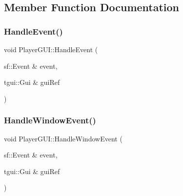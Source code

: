 \subsection{Member Function Documentation}
\mbox{\label{class_player_g_u_i_a06602d2c26b2e1a3edad345d483c6132}} 
\subsubsection{\texorpdfstring{Handle\+Event()}{HandleEvent()}}
{\footnotesize\ttfamily void Player\+G\+U\+I\+::\+Handle\+Event (\begin{DoxyParamCaption}\item[{sf\+::\+Event \&}]{event,  }\item[{tgui\+::\+Gui \&}]{gui\+Ref }\end{DoxyParamCaption})}

\mbox{\label{class_player_g_u_i_a1658f37b9e537d4a7377ca842bf60598}} 
\subsubsection{\texorpdfstring{Handle\+Window\+Event()}{HandleWindowEvent()}}
{\footnotesize\ttfamily void Player\+G\+U\+I\+::\+Handle\+Window\+Event (\begin{DoxyParamCaption}\item[{sf\+::\+Event \&}]{event,  }\item[{tgui\+::\+Gui \&}]{gui\+Ref }\end{DoxyParamCaption})}

